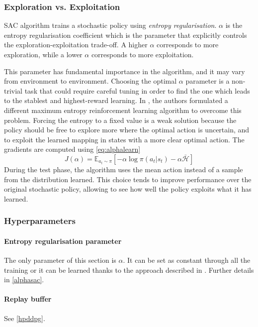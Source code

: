 \subsubsection{Exploration vs. Exploitation} \label{alphasac}
SAC algorithm trains a stochastic policy using \textit{entropy regularisation}. $\alpha$ is the entropy regularisation coefficient which is the parameter that explicitly controls the exploration-exploitation trade-off. A higher $\alpha$ corresponds to more exploration, while a lower $\alpha$ corresponds to more exploitation.

This parameter has fundamental importance in the algorithm, and it may vary from environment to environment. Choosing the optimal $\alpha$ parameter is a non-trivial task that could require careful tuning in order to find the one which leads to the stablest and highest-reward learning. In \cite[Section 5]{haarnoja2018alg}, the authors formulated a different maximum entropy reinforcement learning algorithm to overcome this problem.
Forcing the entropy to a fixed value is a weak solution because the policy should be free to explore more where the optimal action is uncertain, and to exploit the learned mapping in states with a more clear optimal action.
The gradients are computed using \vref{eq:alphalearn}
\begin{equation} \label{eq:alphalearn}
	J(\alpha) = \mathbb{E}_{a_t \sim \pi}[-\alpha \log\pi(a_t|s_t) - \alpha \bar{\mathcal{H}}]
\end{equation}
During the test phase, the algorithm uses the mean action instead of a  sample from the distribution learned. This choice tends to improve performance over the original stochastic policy, allowing to see how well the policy exploits what it has learned.

\subsubsection{Hyperparameters}

\paragraph{Entropy regularisation parameter} The only parameter of this section is $\alpha$. It can be set as constant through all the training or it can be learned thanks to the approach described in \cite{haarnoja2018alg}. Further details in \vref{alphasac}.
\paragraph{Replay buffer} See \vref{hpddpg}.
